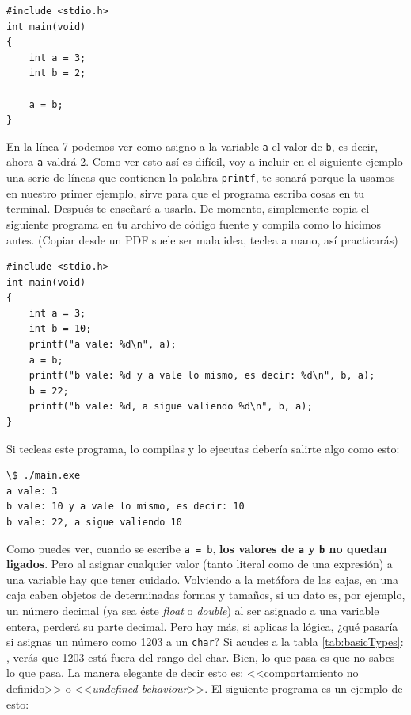 \documentclass[a4paper]{article}
\begin{document}
\noindent
\begin{minipage}[H]{\linewidth}
\mbox{}
\begin{lstlisting}[style=C, caption={Asignación de variables entre ellas},
label={lst:variableAsignationBetween}]
#include <stdio.h>
int main(void)
{
    int a = 3;
    int b = 2;

    a = b;
}
\end{lstlisting}
\end{minipage}


En la línea 7 podemos ver como asigno a la variable \verb!a! el valor de
\verb!b!, es decir, ahora \verb!a! valdrá 2. Como ver esto así es difícil, voy a
incluir en el siguiente
ejemplo una serie de líneas que contienen la palabra \verb!printf!, te sonará
porque la usamos en nuestro primer ejemplo, sirve para que el programa escriba
cosas en tu terminal. Después te enseñaré a usarla.
De momento, simplemente copia el
siguiente programa en tu archivo de código fuente y compila como lo hicimos
antes. (Copiar desde un PDF suele ser mala idea, teclea a mano, así practicarás)

\noindent
\begin{minipage}[H]{\linewidth}
\mbox{}
\begin{lstlisting}[style=C, caption={Ejemplo final de variables},
label={lst:variableFinalExample}]
#include <stdio.h>
int main(void)
{
    int a = 3;
    int b = 10;
    printf("a vale: %d\n", a);
    a = b;
    printf("b vale: %d y a vale lo mismo, es decir: %d\n", b, a);
    b = 22;
    printf("b vale: %d, a sigue valiendo %d\n", b, a);
}
\end{lstlisting}
\end{minipage}


Si tecleas este programa, lo compilas y lo ejecutas
debería salirte algo como esto:


\noindent
\begin{minipage}[H]{\linewidth}
\mbox{}
\begin{lstlisting}[style=terminalStyle]
\$ ./main.exe
a vale: 3
b vale: 10 y a vale lo mismo, es decir: 10
b vale: 22, a sigue valiendo 10
\end{lstlisting}
\end{minipage}

Como puedes ver, cuando se escribe \verb!a = b!,
\textbf{los valores de \texttt{a} y \texttt{b} no quedan ligados}. Pero al
asignar cualquier valor (tanto literal como de una expresión) a una variable
hay que tener cuidado. Volviendo a la metáfora de las cajas, en una caja caben
objetos de determinadas formas y tamaños, si un dato es,
por ejemplo, un número decimal (ya sea éste \textit{float} o \textit{double})
al ser asignado a una variable entera, perderá su parte decimal. Pero hay más,
si aplicas la lógica, ¿qué pasaría si asignas un número como 1203 a un
\texttt{char}? Si acudes a la tabla \ref{tab:basicTypes}:
, verás que 1203 está fuera del rango del
char. Bien, lo que pasa es que no sabes lo que pasa. La manera elegante de decir
esto es: <<comportamiento no definido>> o <<\textit{undefined behaviour}>>.
El siguiente programa es un ejemplo de esto:
\end{document}
